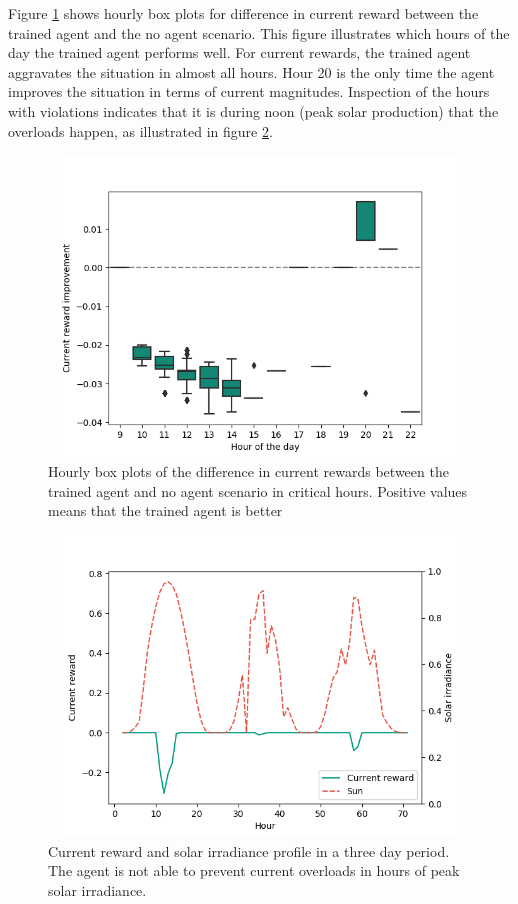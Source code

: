 \documentclass[class=book, crop=false, 11pt]{standalone}
\begin{document}
Figure \ref{fig:results:config1_improvement_current} shows hourly box plots for difference in current reward between the trained agent and the no agent scenario. This figure illustrates which hours of the day the trained agent performs well. For current rewards, the trained agent aggravates the situation in almost all hours. Hour 20 is the only time the agent improves the situation in terms of current magnitudes. Inspection of the hours with violations indicates that it is during noon (peak solar production) that the overloads happen, as illustrated in figure \ref{fig:results:config1_bad_current}.

\begin{figure}[h]
    \center
\includegraphics[height=8cm, width=12cm]{figures/config1_improvement_current.png}
    \caption[size = 9]{Hourly box plots of the difference in current rewards between the trained agent and no agent scenario in critical hours. Positive values means that the trained agent is better}
    \label{fig:results:config1_improvement_current}
\end{figure}



\begin{figure}[h]
    \center
\includegraphics[height=8cm, width=12cm]{figures/config1_bad_current.png}
    \caption[size = 9]{Current reward and solar irradiance profile in a three day period. The agent is not able to prevent current overloads in hours of peak solar irradiance.}
    \label{fig:results:config1_bad_current}
\end{figure}
\end{document}
